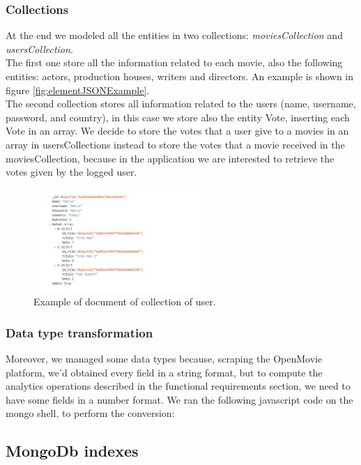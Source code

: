 \documentclass[a4paper, oneside]{article}
\begin{document}
\subsubsection{Collections}
At the end we modeled all the entities in two collections: \textit{moviesCollection} and \textit{usersCollection}.\\
The first one store all the information related to each movie, also the following entities: actors, production houses, writers and directors. An example is shown in figure \ref{fig:elementJSONExample}.\\
The second collection stores all information related to the users (name, username, password, and country), in this case we store also the entity Vote, inserting each Vote in an array. We decide to store the votes that a user give to a movies in an array in usersCollections instead to store the votes that a movie received in the moviesCollection, because in the application we are interested to retrieve the votes given by the logged user.
\begin{figure}[H]
\centering
\includegraphics[width=0.57\textwidth]{./images/screens/userCollection} 
\caption{Example of document of collection of user.}
\label{fig:admin1}
\end{figure}

\subsubsection{Data type transformation}
Moreover, we managed some data types because, scraping the OpenMovie platform, we'd obtained every field in a string format, but to compute the analytics operations described in the functional requirements section, we need to have some fields in a number format. We ran the following javascript code on the mongo shell, to perform the conversion:
\vspace{2mm}

\vspace{5mm}


\subsection{MongoDb indexes}
\end{document}
